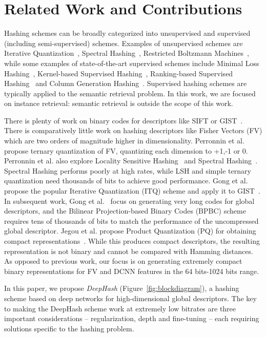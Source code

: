 \documentclass[10pt,twocolumn,letterpaper]{article}
\begin{document}
\section{Related Work and Contributions}

Hashing schemes can be broadly categorized into unsupervised and supervised (including semi-supervised) schemes. Examples of unsupervised schemes are Iterative Quantization~\cite{ITQ}, Spectral Hashing~\cite{SpectralHashing}, Restricted Boltzmann Machines~\cite{HintonRBM}, while some examples of state-of-the-art supervised schemes include Minimal Loss Hashing~\cite{MLH}, Kernel-based Supervised Hashing~\cite{KLSH}, Ranking-based Supervised Hashing~\cite{RSH} and Column Generation Hashing~\cite{CGH}.
Supervised hashing schemes are typically applied to the semantic retrieval problem. 
In this work, we are focused on instance retrieval: semantic retrieval is outside the scope of this work.

There is plenty of work on binary codes for descriptors like SIFT or GIST~\cite{ITQ,SemiSupervisedHashing,SphericalHashing,KristenHashingSurvey,SpectralHashing,KLSH,SKH,MLH,SmallCodes,SIFTSurvey,CHoG}.
There is comparatively little work on hashing descriptors like Fisher Vectors (FV) which are two orders of magnitude higher in dimensionality.
Perronnin et al.~\cite{Perronnin_CVPR_10} propose ternary quantization of FV, quantizing each dimension to +1,-1 or 0. 
Perronnin et al. also explore Locality Sensitive Hashing~\cite{RandomProjections} and Spectral Hashing~\cite{SpectralHashing}.
Spectral Hashing performs poorly at high rates, while LSH and simple ternary quantization need thousands of bits to achieve good performance.
Gong et al.  propose the popular Iterative Quantization (ITQ) scheme and apply it to GIST~\cite{ITQ}.
In subsequent work, Gong et al.~\cite{BPBC} focus on generating very long codes for global descriptors, and the Bilinear Projection-based Binary Codes (BPBC) scheme requires tens of thousands of bits to match the performance of the uncompressed global descriptor.
Jegou et al. propose Product Quantization (PQ) for obtaining compact representations~\cite{PQFisher}. 
While this produces compact descriptors, the resulting representation is not binary and cannot be compared with Hamming distances.
As opposed to previous work, our focus is on generating extremely compact binary representations for FV and DCNN features in the 64 bits-1024 bits range.

In this paper, we propose {\it DeepHash} (Figure~\ref{fig:blockdiagram}), a hashing scheme based on deep networks for high-dimensional global descriptors. The key to making the DeepHash scheme work at extremely low bitrates are three important considerations -- regularization, depth and fine-tuning -- each requiring solutions specific to the hashing problem.
\end{document}
